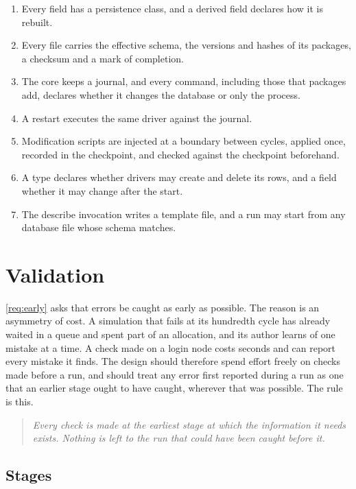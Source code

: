 \documentclass[11pt,a4paper]{article}
\begin{document}
\begin{enumerate}
  \item Every field has a persistence class, and a derived field declares
        how it is rebuilt.
  \item Every file carries the effective schema, the versions and hashes of
        its packages, a checksum and a mark of completion.
  \item The core keeps a journal, and every command, including those that
        packages add, declares whether it changes the database or only the
        process.
  \item A restart executes the same driver against the journal.
  \item Modification scripts are injected at a boundary between cycles,
        applied once, recorded in the checkpoint, and checked against the
        checkpoint beforehand.
  \item A type declares whether drivers may create and delete its rows, and
        a field whether it may change after the start.
  \item The describe invocation writes a template file, and a run may start
        from any database file whose schema matches.
\end{enumerate}

\section{Validation}
\label{sec:validation}

\ref{req:early} asks that errors be caught as early as possible.  The
reason is an asymmetry of cost.  A simulation that fails at its hundredth
cycle has already waited in a queue and spent part of an allocation, and
its author learns of one mistake at a time.  A check made on a login node
costs seconds and can report every mistake it finds.  The design should
therefore spend effort freely on checks made before a run, and should treat
any error first reported during a run as one that an earlier stage ought to
have caught, wherever that was possible.  The rule is this.

\begin{quote}
\emph{Every check is made at the earliest stage at which the information it
needs exists.  Nothing is left to the run that could have been caught
before it.}
\end{quote}

\subsection{Stages}
\end{document}
